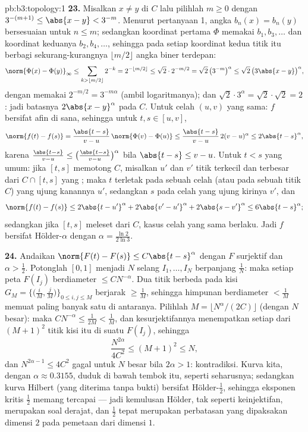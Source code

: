 \begin{solution}{pb:b3:topology:1}
\textbf{23.} Misalkan $x \neq y$ di $C$ lalu pilihlah $m \geq 0$ dengan
$3^{-(m+1)} \leq \abs{x - y} < 3^{-m}$. Menurut pertanyaan 1,
angka $b_n(x) = b_n(y)$ bersesuaian untuk $n \leq m$; sedangkan koordinat pertama
$\Phi$ memakai $b_1, b_3, \dots$ dan koordinat keduanya $b_2,
b_4, \dots$, sehingga pada setiap koordinat kedua titik itu berbagi sekurang-kurangnya
$\lfloor m/2\rfloor$ angka biner terdepan:
\[
\norm{\Phi(x) - \Phi(y)}_\infty
\leq \sum_{k > \lfloor m/2\rfloor}2^{-k}
= 2^{-\lfloor m/2\rfloor} \leq \sqrt2\cdot2^{-m/2}
= \sqrt2\,\bigl(3^{-m}\bigr)^\alpha
\leq \sqrt2\,\bigl(3\abs{x-y}\bigr)^\alpha,
\]
dengan memakai $2^{-m/2} = 3^{-m\alpha}$ (ambil logaritmanya); dan
$\sqrt2\cdot3^\alpha = \sqrt2\cdot\sqrt2 = 2$: jadi batasnya
$2\abs{x-y}^\alpha$ pada $C$. Untuk celah $(u, v)$ yang sama: $f$ bersifat afin
di sana, sehingga untuk $t, s \in [u, v]$,
\[
\norm{f(t) - f(s)} = \frac{\abs{t-s}}{v-u}\,
\norm{\Phi(v) - \Phi(u)}
\leq \frac{\abs{t-s}}{v-u}\,2(v-u)^\alpha
\leq 2\abs{t-s}^\alpha,
\]
karena $\frac{\abs{t-s}}{v-u} \leq \bigl(\frac{\abs{t-s}}
{v-u}\bigr)^\alpha$ bila $\abs{t-s} \leq v - u$. Untuk $t <
s$ yang umum: jika $[t, s]$ memotong $C$, misalkan $u'$ dan $v'$ titik terkecil
dan terbesar dari $C \cap [t, s]$ yang ; maka $t$
terletak pada sebuah celah (atau pada sebuah titik $C$) yang ujung kanannya
$u'$, sedangkan $s$ pada celah yang ujung kirinya $v'$, dan
\[
\norm{f(t) - f(s)} \leq 2\abs{t - u'}^\alpha
+ 2\abs{v' - u'}^\alpha + 2\abs{s - v'}^\alpha
\leq 6\abs{t - s}^\alpha ;
\]
sedangkan jika $[t, s]$ meleset dari $C$, kasus celah yang sama berlaku. Jadi $f$
bersifat Hölder-$\alpha$ dengan $\alpha = \frac{\ln2}{2\ln3}$.

\textbf{24.} Andaikan $\norm{F(t) - F(s)} \leq
C\abs{t-s}^\alpha$ dengan $F$ surjektif dan $\alpha >
\frac12$. Potonglah $[0,1]$ menjadi $N$ selang $I_1, \dots, I_N$
berpanjang $\frac1N$: maka setiap peta $F(I_j)$ berdiameter $\leq
CN^{-\alpha}$. Dua titik berbeda pada kisi $G_M =
\bigl\{\bigl(\frac iM, \frac jM\bigr)\bigr\}_{0 \leq i, j
\leq M}$ berjarak $\geq \frac1M$, sehingga himpunan berdiameter
$< \frac1M$ memuat paling banyak satu di antaranya. Pilihlah $M =
\lfloor N^\alpha/(2C)\rfloor$ (dengan $N$ besar): maka
$CN^{-\alpha} \leq \frac1{2M} < \frac1M$, dan kesurjektifannya
menempatkan setiap dari $(M+1)^2$ titik kisi itu di suatu
$F(I_j)$, sehingga
\[
\frac{N^{2\alpha}}{4C^2} \leq (M + 1)^2 \leq N,
\]
dan $N^{2\alpha - 1} \leq 4C^2$ gagal untuk $N$ besar bila
$2\alpha > 1$: kontradiksi. Kurva kita, dengan $\alpha \approx
0.3155$, duduk di bawah tembok itu, seperti seharusnya; sedangkan kurva Hilbert
(yang diterima tanpa bukti) bersifat Hölder-$\frac12$, sehingga eksponen kritis
$\frac12$ memang tercapai --- jadi kemulusan Hölder, tak seperti
keinjektifan, merupakan soal derajat, dan $\frac12$ tepat
merupakan perbatasan yang dipaksakan dimensi $2$ pada pemetaan dari
dimensi $1$.


\end{solution}
